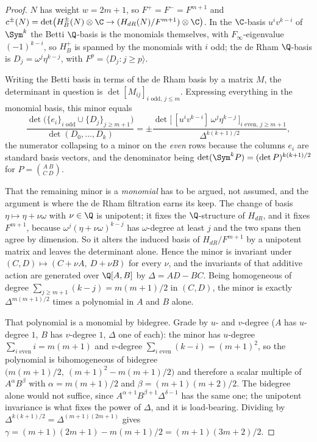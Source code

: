 \begin{proof}
  $N$ has weight $w = 2m+1$, so $F^{+} = F^{-} = F^{m+1}$ and
  $c^{\pm}(N) = \det\bigl(H_{B}^{\pm}(N)\otimes\C \to (H_{dR}(N)/F^{m+1})\otimes\C\bigr)$.
  In the $\C$-basis $u^{i}v^{k-i}$ of $\Sym^{k}$ the Betti $\Q$-basis is the monomials
  themselves, with $F_{\infty}$-eigenvalue $(-1)^{k-i}$, so $H_{B}^{+}$ is spanned by the
  monomials with $i$ odd; the de Rham $\Q$-basis is $D_{j} = \omega^{j}\eta^{k-j}$, with
  $F^{p} = \langle D_{j} : j \geq p\rangle$.

  Writing the Betti basis in terms of the de Rham basis by a matrix $M$, the determinant in
  question is $\det[M_{ij}]_{i \text{ odd},\, j \le m}$. Expressing everything in the monomial
  basis, this minor equals
  \[
    \frac{\det\bigl(\{e_{i}\}_{i \text{ odd}} \cup \{D_{j}\}_{j \geq m+1}\bigr)}
         {\det(D_{0},\dots,D_{k})}
    = \pm\frac{\det\bigl[\,[u^{i}v^{k-i}]\,\omega^{j}\eta^{k-j}\,\bigr]_{i \text{ even},\, j \geq m+1}}
              {\Delta^{k(k+1)/2}},
  \]
  the numerator collapsing to a minor on the \emph{even} rows because the columns $e_{i}$ are
  standard basis vectors, and the denominator being $\det(\Sym^{k}P) = (\det P)^{k(k+1)/2}$
  for $P = \binom{A\ B}{C\ D}$.

  That the remaining minor is a \emph{monomial} has to be argued, not assumed, and the
  argument is where the de Rham filtration earns its keep. The change of basis
  $\eta \mapsto \eta + \nu\omega$ with $\nu \in \Q$ is unipotent; it fixes the $\Q$-structure
  of $H_{dR}$, and it fixes $F^{m+1}$, because $\omega^{j}(\eta+\nu\omega)^{k-j}$ has
  $\omega$-degree at least $j$ and the two spans then agree by dimension. So it alters the
  induced basis of $H_{dR}/F^{m+1}$ by a unipotent matrix and leaves the determinant alone.
  Hence the minor is invariant under $(C,D) \mapsto (C+\nu A,\ D+\nu B)$ for every $\nu$, and
  the invariants of that additive action are generated over $\Q[A,B]$ by $\Delta = AD-BC$.
  Being homogeneous of degree $\sum_{j \geq m+1}(k-j) = m(m+1)/2$ in $(C,D)$, the minor is
  exactly $\Delta^{m(m+1)/2}$ times a polynomial in $A$ and $B$ alone.

  That polynomial is a monomial by bidegree. Grade by $u$- and $v$-degree ($A$ has $u$-degree
  $1$, $B$ has $v$-degree $1$, $\Delta$ one of each): the minor has $u$-degree
  $\sum_{i \text{ even}} i = m(m+1)$ and $v$-degree $\sum_{i \text{ even}}(k-i) = (m+1)^{2}$,
  so the polynomial is bihomogeneous of bidegree $\bigl(m(m+1)/2,\ (m+1)^{2}-m(m+1)/2\bigr)$
  and therefore a scalar multiple of $A^{\alpha}B^{\beta}$ with $\alpha = m(m+1)/2$ and
  $\beta = (m+1)(m+2)/2$. The bidegree alone would not suffice, since
  $A^{\alpha+1}B^{\beta+1}\Delta^{\delta-1}$ has the same one; the unipotent invariance is
  what fixes the power of $\Delta$, and it is load-bearing. Dividing by
  $\Delta^{k(k+1)/2} = \Delta^{(m+1)(2m+1)}$ gives
  $\gamma = (m+1)(2m+1) - m(m+1)/2 = (m+1)(3m+2)/2$.


\end{proof}
